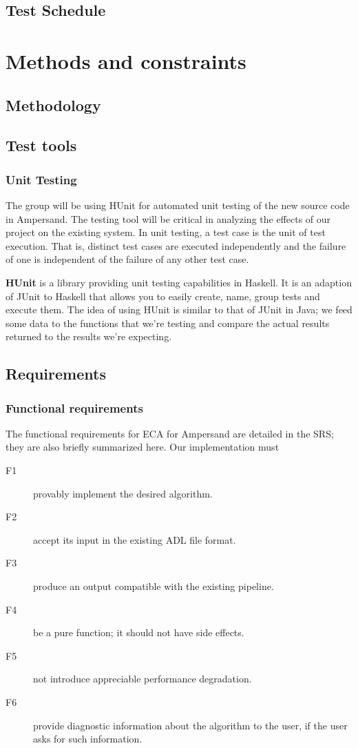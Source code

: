 \documentclass[12pt]{report}
\begin{document}
\section{Test Schedule}


\chapter{Methods and constraints}
\section{Methodology}
\section{Test tools}
\subsection{Unit Testing}
The group will be using HUnit for automated unit testing of the new source code in Ampersand. The testing tool will be critical in analyzing the effects of our project on the existing system.  In unit testing, a test case is the unit of test execution. That is, distinct test cases are executed independently and the failure of one is independent of the failure of any other test case.

\textbf{HUnit} is a library providing unit testing capabilities in Haskell. 
It is an adaption of JUnit to Haskell that allows you to easily create, name, group tests and execute them.
The idea of using HUnit is similar to that of JUnit in Java; we feed some data to the functions that we're testing 
and compare the actual results returned to the results we're expecting. 
\section{Requirements}
\subsection{Functional requirements}
The functional requirements for ECA for Ampersand are detailed in the SRS; they
are also briefly summarized here. Our implementation must

\begin{description}
\item[F1] provably implement the desired algorithm.
\item[F2] accept its input in the existing ADL file format.
\item[F3] produce an output compatible with the existing pipeline. 
\item[F4] be a pure function; it should not have side effects.  
\item[F5] not introduce appreciable performance degradation. 
\item[F6] provide diagnostic information about the algorithm to
the user, if the user asks for such information.
\end{description}
\end{document}

